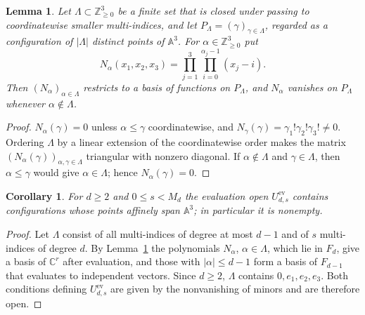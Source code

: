 \documentclass{amsart}
\newtheorem{lemma}[theorem]{Lemma}
\newtheorem{corollary}[theorem]{Corollary}
\theoremstyle{definition}
\theoremstyle{remark}
\numberwithin{equation}{section}
\newcommand{\CC}{\mathbb{C}}
\newcommand{\A}{\mathbb{A}}
\newcommand{\ZZ}{\mathbb{Z}}
\begin{document}
\begin{lemma}\label{lem:newton}
Let $\Lambda\subset\ZZ_{\ge0}^3$ be a finite set that is closed under passing to
coordinatewise smaller multi-indices, and let $P_\Lambda=(\gamma)_{\gamma\in\Lambda}$,
regarded as a configuration of $|\Lambda|$ distinct points of $\A^3$. For
$\alpha\in\ZZ_{\ge0}^3$ put
\[
  N_\alpha(x_1,x_2,x_3)=\prod_{j=1}^3\prod_{i=0}^{\alpha_j-1}(x_j-i).
\]
Then $(N_\alpha)_{\alpha\in\Lambda}$ restricts to a basis of functions on
$P_\Lambda$, and $N_\alpha$ vanishes on $P_\Lambda$ whenever $\alpha\notin\Lambda$.
\end{lemma}

\begin{proof}
$N_\alpha(\gamma)=0$ unless $\alpha\le\gamma$ coordinatewise, and
$N_\gamma(\gamma)=\gamma_1!\gamma_2!\gamma_3!\ne 0$. Ordering $\Lambda$ by a linear
extension of the coordinatewise order makes the matrix
$(N_\alpha(\gamma))_{\alpha,\gamma\in\Lambda}$ triangular with nonzero diagonal. If
$\alpha\notin\Lambda$ and $\gamma\in\Lambda$, then $\alpha\le\gamma$ would give
$\alpha\in\Lambda$; hence $N_\alpha(\gamma)=0$.
\end{proof}

\begin{corollary}\label{cor:evopen}
For $d\ge2$ and $0\le s<M_d$ the evaluation open $U^{\mathrm{ev}}_{d,s}$ contains
configurations whose points affinely span $\A^3$; in particular it is nonempty.
\end{corollary}

\begin{proof}
Let $\Lambda$ consist of all multi-indices of degree at most $d-1$ and of $s$
multi-indices of degree $d$. By Lemma~\ref{lem:newton} the polynomials $N_\alpha$,
$\alpha\in\Lambda$, which lie in $F_d$, give a basis of $\CC^r$ after evaluation, and
those with $|\alpha|\le d-1$ form a basis of $F_{d-1}$ that evaluates to independent
vectors. Since $d\ge2$, $\Lambda$ contains $0,e_1,e_2,e_3$. Both conditions defining
$U^{\mathrm{ev}}_{d,s}$ are given by the nonvanishing of minors and are therefore open.
\end{proof}
\end{document}
